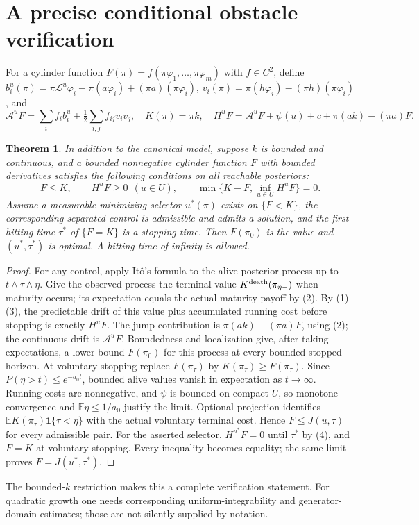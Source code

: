 \documentclass[11pt]{article}
\newtheorem{theorem}{Theorem}
\theoremstyle{definition}
\begin{document}
\section*{A precise conditional obstacle verification}
For a cylinder function
$F(\pi)=f(\pi\varphi_1,\ldots,\pi\varphi_m)$ with $f\in C^2$, define
$b_i^u(\pi)=\pi\mathcal L^u\varphi_i-\pi(a\varphi_i)+(\pi a)(\pi\varphi_i)$,
$v_i(\pi)=\pi(h\varphi_i)-(\pi h)(\pi\varphi_i)$, and
\[
 \mathcal A^uF=\sum_i f_i b_i^u+\tfrac12\sum_{i,j}f_{ij}v_iv_j,
 \quad K(\pi)=\pi k,\quad
 H^uF=\mathcal A^uF+\psi(u)+c+\pi(ak)-(\pi a)F.          \tag{3}
\]
\begin{theorem}
In addition to the canonical model, suppose $k$ is bounded and continuous,
and a bounded nonnegative cylinder function $F$ with bounded derivatives
satisfies the following conditions on all reachable posteriors:
\[
 F\le K,\qquad H^uF\ge0\ \ (u\in U),\qquad
 \min\{K-F,\inf_{u\in U}H^uF\}=0.                     \tag{4}
\]
Assume a measurable minimizing selector $u^*(\pi)$ exists on $\{F<K\}$,
the corresponding separated control is admissible and admits a solution,
and the first hitting time $\tau^*$ of $\{F=K\}$ is a stopping time.
Then $F(\pi_0)$ is the value and $(u^*,\tau^*)$ is optimal. A hitting time
of infinity is allowed.
\end{theorem}
\begin{proof}
For any control, apply It\^o's formula to the alive posterior process up
to $t\wedge\tau\wedge\eta$. Give the observed process the terminal value
$K^{\rm death}(\pi_{\eta-})$ when maturity occurs; its expectation equals
the actual maturity payoff by (2). By (1)--(3), the predictable drift of
this value plus accumulated running cost before stopping is exactly
$H^uF$. The jump contribution is
$\pi(ak)-(\pi a)F$, using (2); the continuous drift is $\mathcal A^uF$.
Boundedness and localization give, after taking expectations, a lower
bound $F(\pi_0)$ for this process at every bounded stopped horizon.
At voluntary stopping replace $F(\pi_\tau)$ by $K(\pi_\tau)\ge F(\pi_\tau)$.
Since $P(\eta>t)\le e^{-a_0t}$, bounded alive values vanish in expectation
as $t\to\infty$. Running costs are nonnegative, and $\psi$ is bounded
on compact $U$, so monotone convergence and $\mathbb E\eta\le1/a_0$
justify the limit. Optional projection identifies
$\mathbb E K(\pi_\tau)\mathbf1\{\tau<\eta\}$ with the actual voluntary
terminal cost. Hence $F\le J(u,\tau)$ for every admissible pair.
For the asserted selector, $H^{u^*}F=0$ until $\tau^*$ by (4), and
$F=K$ at voluntary stopping. Every inequality becomes equality; the same
limit proves $F=J(u^*,\tau^*)$.
\end{proof}
The bounded-$k$ restriction makes this a complete verification statement.
For quadratic growth one needs corresponding uniform-integrability and
generator-domain estimates; those are not silently supplied by notation.
\end{document}
